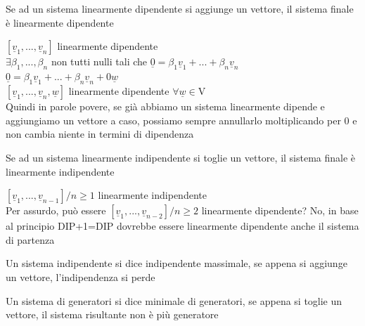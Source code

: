 \begin{nota}[DIP+1=DIP]
	Se ad un sistema linearmente dipendente si aggiunge un vettore, il sistema finale è linearmente dipendente
	\begin{dimostrazione}
		$[\underline{v}_1,...,\underline{v}_n]$ linearmente dipendente\\
		$\exists\beta_1,...,\beta_n$ non tutti nulli tali che $\underline{0}=\beta_1\underline{v}_1+...+\beta_n\underline{v}_n$\\
		$\underline{0}=\beta_1\underline{v}_1+...+\beta_n\underline{v}_n+0\underline{w}$\\
		$[\underline{v}_1,...,\underline{v}_n,\underline{w}]$ linearmente dipendente $\forall\underline{w}\in$V\\
		Quindi in parole povere, se già abbiamo un sistema linearmente dipende e aggiungiamo un vettore a caso, possiamo sempre annullarlo moltiplicando per 0 e non cambia niente in termini di dipendenza
	\end{dimostrazione}
\end{nota}

\begin{nota}[INDIP-1=INDIP]
	Se ad un sistema linearmente indipendente si toglie un vettore, il sistema finale è linearmente indipendente
	\begin{dimostrazione}
		$[\underline{v}_1,...,\underline{v}_{n-1}]/n\geq 1$ linearmente indipendente\\
		Per assurdo, può essere $[\underline{v}_1,...,\underline{v}_{n-2}]/n\geq 2$ linearmente dipendente? No, in base al principio DIP+1=DIP dovrebbe essere linearmente dipendente anche il sistema di partenza
	\end{dimostrazione}
\end{nota}

\begin{nota}
	Un sistema indipendente si dice indipendente massimale, se appena si aggiunge un vettore, l'indipendenza si perde
\end{nota}

\begin{nota}
	Un sistema di generatori si dice minimale di generatori, se appena si toglie un vettore, il sistema risultante non è più generatore
\end{nota}
